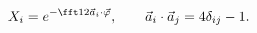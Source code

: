 \begin{equation}
X_i=e^{-\fft12\vec a_i\cdot\vec\varphi},\qquad
\vec a_i\cdot\vec a_j=4\delta_{ij}-1.
\end{equation}

